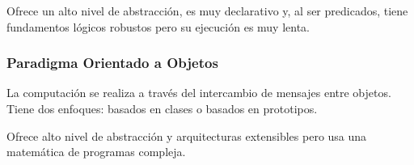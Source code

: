 Ofrece un alto nivel de abstracción, es muy declarativo y, al ser predicados, tiene fundamentos lógicos robustos pero su ejecución es muy lenta.

\subsubsection{Paradigma Orientado a Objetos}
La computación se realiza a través del intercambio de mensajes entre objetos. Tiene dos enfoques: basados en clases o basados en prototipos.

Ofrece alto nivel de abstracción y arquitecturas extensibles pero usa una matemática de programas compleja.

